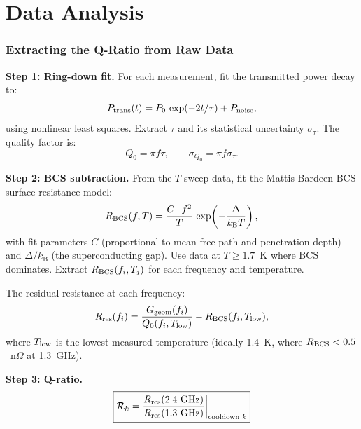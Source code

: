 \documentclass[11pt]{article}
\newcommand{\kB}{k_{\mathrm{B}}}
\theoremstyle{definition}
\theoremstyle{remark}
\begin{document}
\part{Data Analysis}
\label{sec:analysis}


\section{Extracting the Q-Ratio from Raw Data}
\label{sec:extraction}

\textbf{Step 1: Ring-down fit.}
For each measurement, fit the transmitted power decay to:
\begin{equation}
P_{\rm trans}(t) = P_0\,\exp(-2t/\tau) + P_{\rm noise},
\end{equation}
using nonlinear least squares. Extract $\tau$ and its statistical
uncertainty $\sigma_\tau$. The quality factor is:
\begin{equation}
Q_0 = \pi f \tau, \qquad
\sigma_{Q_0} = \pi f \sigma_\tau.
\end{equation}

\textbf{Step 2: BCS subtraction.}
From the $T$-sweep data, fit the Mattis-Bardeen BCS surface
resistance model:
\begin{equation}
R_{\rm BCS}(f, T) = \frac{C \cdot f^2}{T}\,
\exp\!\left(-\frac{\Delta}{\kB T}\right),
\end{equation}
with fit parameters $C$ (proportional to mean free path and
penetration depth) and $\Delta/\kB$ (the superconducting gap).
Use data at $T \geq 1.7$~K where BCS dominates. Extract
$R_{\rm BCS}(f_i, T_j)$ for each frequency and temperature.

The residual resistance at each frequency:
\begin{equation}
R_{\rm res}(f_i) = \frac{G_{\rm geom}(f_i)}{Q_0(f_i, T_{\rm low})}
- R_{\rm BCS}(f_i, T_{\rm low}),
\end{equation}
where $T_{\rm low}$ is the lowest measured temperature (ideally
1.4~K, where $R_{\rm BCS} < 0.5$~n$\Omega$ at 1.3~GHz).

\textbf{Step 3: Q-ratio.}
\begin{equation}
\boxed{
\mathcal{R}_k = \frac{R_{\rm res}(2.4~{\rm GHz})}
                     {R_{\rm res}(1.3~{\rm GHz})}
\bigg|_{\text{cooldown } k}
}
\end{equation}
\end{document}
